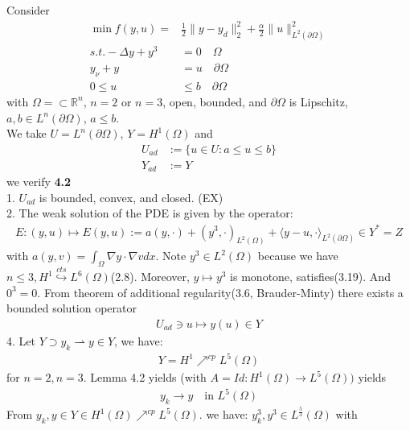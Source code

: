 \begin{example}
		Consider 
		\begin{align*}
			\min f(y, u) =& \frac{1}{2} \|y - y_d\|^2_2 + \frac{\alpha}{2}\|u\|^2_{L^2(\partial \Omega)}\\
			s.t. -\Delta y + y^3 &= 0 \quad \Omega\\
			y_\nu + y &= u \quad \partial \Omega\\
			0 \le u &\le b \quad \partial \Omega
		\end{align*}
		with $\Omega = \subset \mathbb{R}^n$, $n = 2$ or $n = 3$, open, bounded, and $\partial\Omega$ is Lipschitz, $a, b \in L^n(\partial\Omega)$, $a \le b$. \\
		We take $U = L^n(\partial \Omega)$, $Y = H^1(\Omega)$ and 
	\begin{align*}
		U_{ad} &:= \{u \in U: a \le u \le b \}\\
		Y_{ad} &:= Y
	\end{align*}
		we verify \textbf{4.2}\\
		1. $U_{ad}$ is bounded, convex, and closed. (EX)\\
		2. The weak solution of the PDE is given by the operator:
		\begin{align*}
			E:(y, u) \mapsto E(y, u):= a(y, \cdot) + (y^3, \cdot)_{L^2(\Omega)} + \langle y - u, \cdot \rangle _{L^2(\partial\Omega)} \in Y^* = Z
		\end{align*}
		with $a(y, v) = \int_\Omega \nabla y \cdot \nabla v dx$. Note $y^3 \in L^2(\Omega)$ because we have $n \le 3, H^1 \overset{cts}{\hookrightarrow}  L^6(\Omega)$(2.8).
		Moreover, $y \mapsto y^3$ is monotone, satisfies(3.19). And $0^3 = 0$. From theorem of additional regularity(3.6, Brauder-Minty) there exists a bounded solution operator 
		\begin{align*}
			U_{ad} \ni u \mapsto y(u) \in Y
		\end{align*} 
		4. Let $Y \supset y_k \rightharpoonup y \in Y$, we have:
		\begin{align*}
			Y = H^1 \nearrow^{cp} L^5(\Omega)
		\end{align*}
		for $n = 2, n = 3$. Lemma 4.2 yields (with $A = Id: H^1(\Omega) \rightarrow L^5(\Omega))$ yields
		\begin{align*}
			y_k \rightarrow y \quad \text{in } L^5(\Omega)
		\end{align*}
		From $y_k, y \in Y \in H^1(\Omega) \nearrow^{cp} L^5(\Omega)$. we have: $y_k^3, y^3 \in L^{\frac{5}{3}} (\Omega)$ with
		\begin{align*}

\end{align*}
\end{example}
